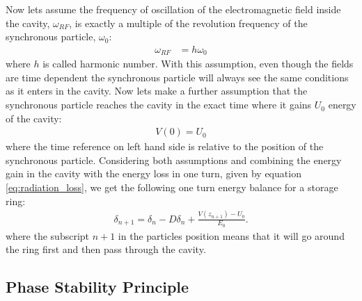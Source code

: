 \documentclass[
	12pt,				%
	openright,			%
	oneside,			%
	a4paper,		%
	chapter=TITLE,		%
	section=TITLE,		%
    brazil,				%
	english,			%
	sumario=tradicional,
	]{abntex2}
\begin{document}
	Now lets assume the frequency of oscillation of the electromagnetic field inside the cavity, $\omega_{RF}$, is exactly a multiple of the revolution frequency of the synchronous particle, $\omega_0$:
	\begin{align}\label{eq:harmonic_number}
		\omega_{RF} &= h\omega_0
	\end{align}
	where $h$ is called harmonic number. With this assumption, even though the fields are time dependent the synchronous particle will always see the same conditions as it enters in the cavity. Now lets make a further assumption that the synchronous particle reaches the cavity in the exact time where it gains $U_0$ energy of the cavity:
	\begin{align}
		V(0) = U_0
	\end{align}
	where the time reference on left hand side is relative to the position of the synchronous particle. Considering both assumptions and combining the energy gain in the cavity with the energy loss in one turn, given by equation \eqref{eq:radiation_loss}, we get the following one turn energy balance for a storage ring:
	\begin{align}\label{eq:energy_balance}
		\delta_{n+1} = \delta_n - D\delta_n + \frac{V(z_{n+1})-U_0}{E_0}.
	\end{align}
	where the subscript $n+1$ in the particles position means that it will go around the ring first and then pass through the cavity.

	\subsection{Phase Stability Principle}
\end{document}
